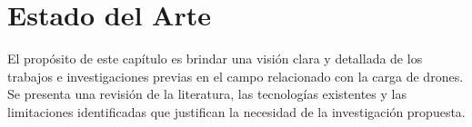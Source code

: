 
\section{Estado del Arte}

El propósito de este capítulo es brindar una visión clara y detallada de los trabajos e investigaciones previas en el campo relacionado con la carga de drones. Se presenta una revisión de la literatura, las tecnologías existentes y las limitaciones identificadas que justifican la necesidad de la investigación propuesta.









    




